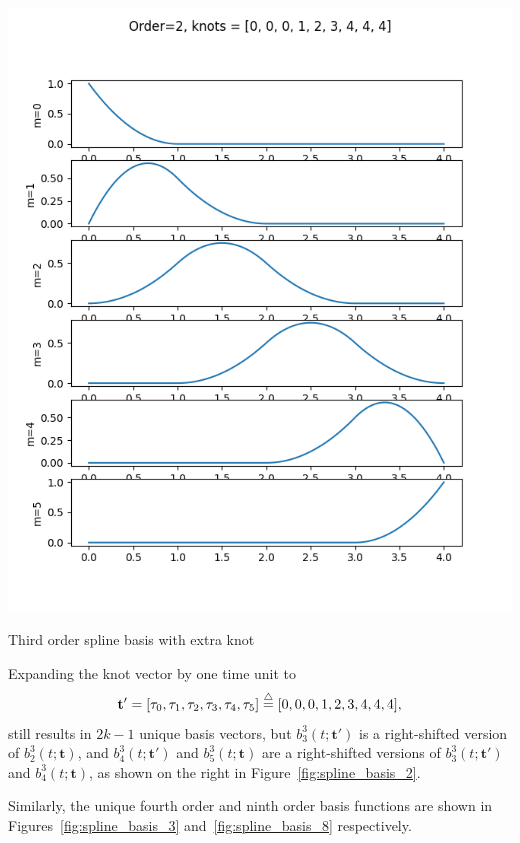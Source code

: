 \begin{marginfigure}[-2.5in]
  	\includegraphics[width=\linewidth]{./chap5_trajectory_planning/figures/spline_basis_2_extra_knot}
  \caption{Third order spline basis with extra knot}
  \label{fig:spline_basis_2}  
\end{marginfigure}
Expanding the knot vector by one time unit to 
\[
\mathbf{t}' = [\tau_0, \tau_1, \tau_2, \tau_3, \tau_4, \tau_5] \stackrel{\triangle}{=} [0, 0, 0, 1, 2, 3, 4, 4, 4],
\]
still results in $2k-1$ unique basis vectors, but $b_3^3(t; \mathbf{t}')$ is a right-shifted version of $b_2^3(t; \mathbf{t})$, and $b_4^3(t; \mathbf{t}')$ and $b_5^3(t; \mathbf{t})$ are a right-shifted versions of $b_3^3(t; \mathbf{t}')$ and $b_4^3(t; \mathbf{t})$, as shown on the right in Figure~\ref{fig:spline_basis_2}.

Similarly, the unique fourth order and ninth order basis functions are shown in Figures~\ref{fig:spline_basis_3} and~\ref{fig:spline_basis_8} respectively.

